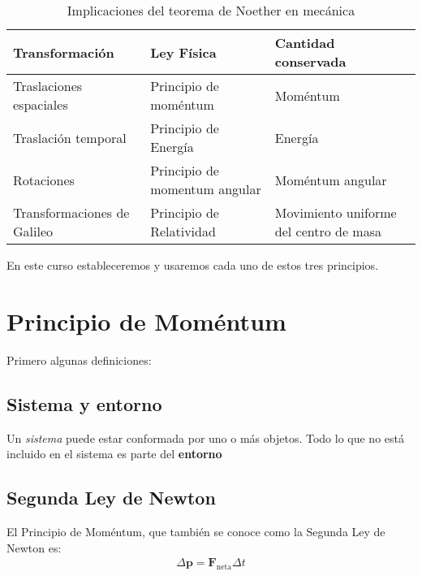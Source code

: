 \begin{frame}
  
\begin{table}
  \centering
  \begin{tabular}{|p{5cm}|l|p{5cm}|}\hline{}
    \textbf{Transformación} &\textbf{Ley Física}  &  \textbf{Cantidad conservada}\\\hline
Traslaciones espaciales & Principio de moméntum & Moméntum\\
Traslación temporal & Principio de Energía & Energía\\
Rotaciones & Principio de momentum angular & Moméntum angular\\
Transformaciones de Galileo&Principio de Relatividad & 
Movimiento uniforme del centro de masa\\\hline
  \end{tabular}
  \caption{Implicaciones del teorema de Noether en mecánica}
  \label{tab:tn}
\end{table}
\end{frame}

En este curso estableceremos y usaremos cada uno de estos tres principios.

\section{Principio de Moméntum}

Primero algunas definiciones:

\subsection{Sistema y entorno}

Un \emph{sistema} puede estar conformada por uno o más objetos. Todo lo que no está incluido en el sistema es parte del \textbf{entorno}



\subsection{Segunda Ley de Newton}

\begin{frame}
{El Principio de Moméntum}, que también se conoce como la Segunda Ley de Newton es:
\begin{align}
\label{eq:ppiomomentum}
  \Delta\mathbf{p}=\mathbf{F}_{\text{neta}}\Delta t
\end{align}
\end{frame}


